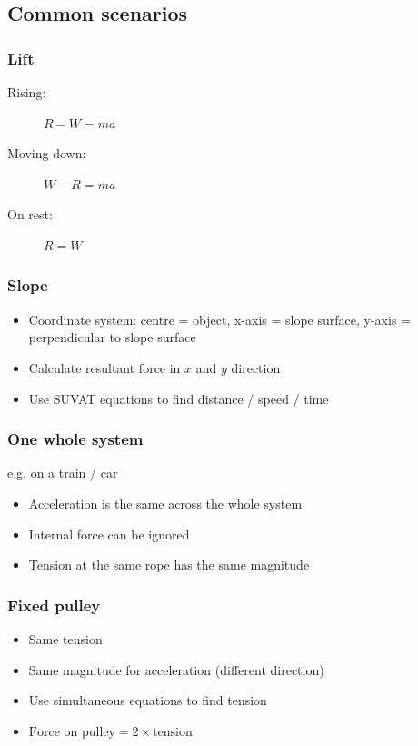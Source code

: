 \documentclass[A4paper, 11pt]{article}
\begin{document}
	\subsection{Common scenarios}
	\subsubsection{Lift}
	\begin{description}
		\item[Rising: ] $R-W=ma$
		\item[Moving down: ] $W-R=ma$
		\item[On rest: ] $R=W$
	\end{description}
	
	\subsubsection{Slope}
	\begin{itemize}
		\item Coordinate system: centre = object, x-axis = slope surface, y-axis = perpendicular to slope surface
		\item Calculate resultant force in $x$ and $y$ direction
		\item Use SUVAT equations to find distance / speed / time
	\end{itemize}
	
	\subsubsection{One whole system}
	e.g. on a train / car
	\begin{itemize}
		\item Acceleration is the same across the whole system
		\item Internal force can be ignored
		\item Tension at the same rope has the same magnitude
	\end{itemize}
	
	\subsubsection{Fixed pulley}
	\begin{itemize}
		\item Same tension
		\item Same magnitude for acceleration (different direction)
		\item Use simultaneous equations to find tension
		\item $\text{Force on pulley} = 2 \times \text{tension}$
	\end{itemize}
	
\end{document}
